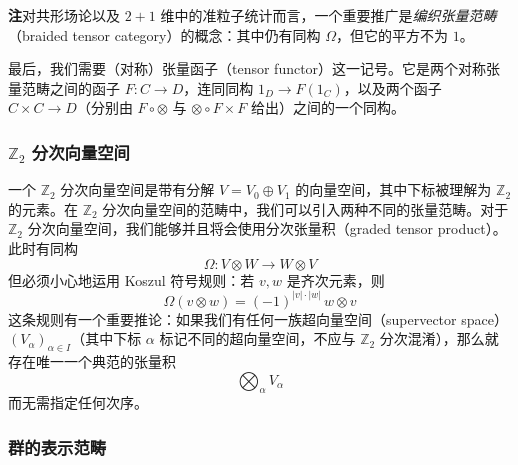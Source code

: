 \textbf{注}\quad 对共形场论以及 $2+1$ 维中的准粒子统计而言，一个重要推广是\emph{编织张量范畴}（braided tensor category）的概念：其中仍有同构 $\Omega$，但它的平方不为 $1$。

最后，我们需要（对称）张量函子（tensor functor）这一记号。它是两个对称张量范畴之间的函子 $F:C\to D$，连同同构 $1_D\to F(1_C)$，以及两个函子 $C\times C\to D$（分别由 $F\circ\otimes$ 与 $\otimes\circ F\times F$ 给出）之间的一个同构。

\subsubsection{$\mathbb{Z}_2$ 分次向量空间} %

一个 $\mathbb{Z}_2$ 分次向量空间是带有分解 $V=V_0\oplus V_1$ 的向量空间，其中下标被理解为 $\mathbb{Z}_2$ 的元素。在 $\mathbb{Z}_2$ 分次向量空间的范畴中，我们可以引入两种不同的张量范畴。对于 $\mathbb{Z}_2$ 分次向量空间，我们能够并且将会使用分次张量积（graded tensor product）。此时有同构
\begin{equation}
  \Omega:V\otimes W\to W\otimes V
  \tag{K.50}
  \label{eq:K.50}
\end{equation}
但必须小心地运用 Koszul 符号规则：若 $v,w$ 是齐次元素，则
\begin{equation}
  \Omega(v\otimes w)=(-1)^{|v|\cdot|w|}\,w\otimes v
  \tag{K.51}
  \label{eq:K.51}
\end{equation}
这条规则有一个重要推论：如果我们有任何一族超向量空间（supervector space）$(V_\alpha)_{\alpha\in I}$（其中下标 $\alpha$ 标记不同的超向量空间，不应与 $\mathbb{Z}_2$ 分次混淆），那么就存在唯一一个典范的张量积
\begin{equation*}
  \bigotimes_{\alpha}V_\alpha
\end{equation*}
而无需指定任何次序。


\subsubsection{群的表示范畴} %

